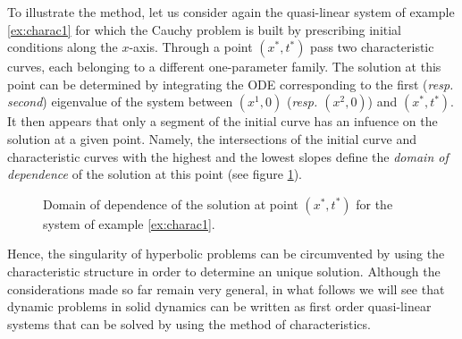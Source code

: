 To illustrate the method, let us consider again the quasi-linear system of example \ref{ex:charac1} for which the Cauchy problem is built by prescribing initial conditions along the $x$-axis. Through a point $(x^*,t^*)$ pass two characteristic curves, each belonging to a different one-parameter family. The solution at this point can be determined by integrating the ODE corresponding to the first (\textit{resp. second}) eigenvalue of the system between $(x^1,0)$ (\textit{resp. $(x^2,0)$}) and $(x^*,t^*)$. It then appears that only a segment of the initial curve has an infuence on the solution at a given point. Namely, the intersections of the initial curve and characteristic curves with the highest and the lowest slopes define the \textit{domain of dependence} of the solution at this point (see figure \ref{fig:charac_method2x2}). 
\begin{figure}[h]
  \centering
  
  \caption{Domain of dependence of the solution at point $(x^*,t^*)$ for the system of example \ref{ex:charac1}.}
  \label{fig:charac_method2x2}
\end{figure}

Hence, the singularity of hyperbolic problems can be circumvented by using the characteristic structure in order to determine an unique solution. Although the considerations made so far remain very general, in what follows we will see that dynamic problems in solid dynamics can be written as first order quasi-linear systems that can be solved by using the method of characteristics. 



